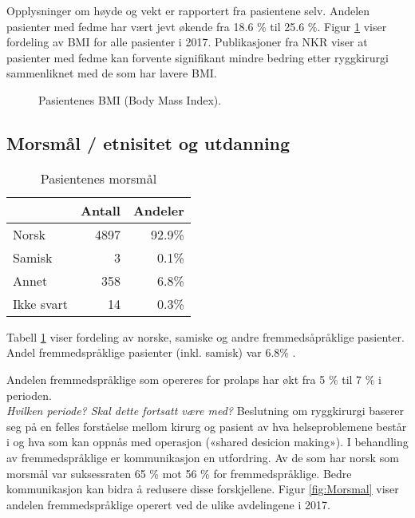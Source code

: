 \documentclass [norsk,a4paper,twoside]{article}\usepackage[]{graphicx}\usepackage[]{color}
\begin{document}
Opplysninger om høyde og vekt er rapportert fra pasientene selv.
Andelen pasienter med fedme har vært jevt økende fra 18.6 \%
til 25.6 \%.
Figur \ref{fig:BMI} viser fordeling av BMI for alle pasienter i 2017. 
Publikasjoner fra NKR viser at pasienter med fedme kan forvente signifikant mindre bedring etter 
ryggkirurgi sammenliknet med de som har lavere BMI. 

\begin{figure}[ht]
\caption{\label{fig:BMI} Pasientenes BMI (Body Mass Index).}
\end{figure}





\subsection{Morsmål / etnisitet og utdanning}

\begin{table}[ht]
\centering
\begin{tabular}{lrr}
  \hline
 & Antall & Andeler \\ 
  \hline
Norsk & 4897 & 92.9\% \\ 
  Samisk & 3 & 0.1\% \\ 
  Annet & 358 & 6.8\% \\ 
  Ikke svart & 14 & 0.3\% \\ 
   \hline
\end{tabular}
\caption{Pasientenes morsmål} 
\label{tab:Morsm}
\end{table}


Tabell \ref{tab:Morsm} viser fordeling av norske, samiske og andre fremmedsåpråklige pasienter.
Andel fremmedspråklige pasienter (inkl. samisk) var 6.8\% . 

Andelen fremmedspråklige som opereres for prolaps har økt fra 5 \% til 7 \% i perioden. \\
\textit{Hvilken periode? Skal dette fortsatt være med?}
Beslutning om ryggkirurgi baserer seg på en felles forståelse mellom kirurg og
pasient av hva helseproblemene består i og hva som kan oppnås med operasjon
(«shared desicion making»). I behandling av fremmedspråklige er kommunikasjon
en utfordring. Av de som har norsk som morsmål var suksessraten 65 \% mot 56 \%
for fremmedspråklige. Bedre kommunikasjon kan bidra å redusere disse
forskjellene. Figur \ref{fig:Morsmal} viser andelen fremmedspråklige operert ved de ulike avdelingene i 2017.
\end{document}
